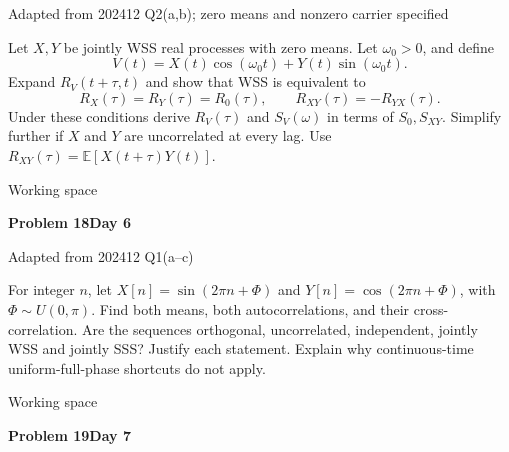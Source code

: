 \documentclass[11pt]{article}
\newcommand{\E}{\mathbb E}\newcommand{\ee}{\mathrm e}\newcommand{\jj}{\mathrm j}
\newcommand{\qtitle}[2]{\clearpage\begin{tcolorbox}[colback=navy,colframe=navy,arc=1.5pt,boxrule=0pt]\color{white}\large\bfseries #1\hfill\small #2\end{tcolorbox}}
\begin{document}
{\small\color{accentred}Adapted from 202412 Q2(a,b); zero means and nonzero carrier specified}\par{}\par{}\par\smallskip\begin{tcolorbox}[colback=qbg,colframe=qbg,boxrule=0pt]Let $X,Y$ be jointly WSS real processes with zero means. Let $\omega_0>0$, and define
\[V(t)=X(t)\cos(\omega_0t)+Y(t)\sin(\omega_0t).\]
Expand $R_V(t+\tau,t)$ and show that WSS is equivalent to
\[R_X(\tau)=R_Y(\tau)=R_0(\tau),\qquad R_{XY}(\tau)=-R_{YX}(\tau).\]
Under these conditions derive $R_V(\tau)$ and $S_V(\omega)$ in terms of $S_0,S_{XY}$. Simplify further if $X$ and $Y$ are uncorrelated at every lag. Use $R_{XY}(\tau)=\E[X(t+\tau)Y(t)]$.\end{tcolorbox}\smallskip\begin{workspace}\hfill{\color{linec}\footnotesize Working space}\end{workspace}
\qtitle{Problem 18}{Day 6}
{\small\color{accentred}Adapted from 202412 Q1(a--c)}\par{}\par{}\par\smallskip\begin{tcolorbox}[colback=qbg,colframe=qbg,boxrule=0pt]For integer $n$, let $X[n]=\sin(2\pi n+\Phi)$ and $Y[n]=\cos(2\pi n+\Phi)$, with $\Phi\sim U(0,\pi)$. Find both means, both autocorrelations, and their cross-correlation. Are the sequences orthogonal, uncorrelated, independent, jointly WSS and jointly SSS? Justify each statement. Explain why continuous-time uniform-full-phase shortcuts do not apply.\end{tcolorbox}\smallskip\begin{workspace}\hfill{\color{linec}\footnotesize Working space}\end{workspace}
\qtitle{Problem 19}{Day 7}
\end{document}
